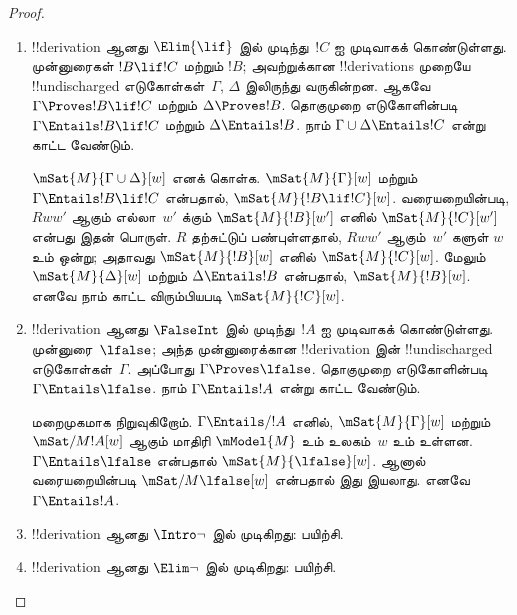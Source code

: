 \documentclass[../../../include/open-logic-section]{subfiles}
\begin{document}
\begin{proof}
\begin{enumerate}
    $\mSat{M}{\Gamma}[w]$ எனக் கொள்க. $Rww'$ ஆகும் எல்லா~$w'$ க்கும்,
    $\mSat{M}{!B}[w']$ எனில் $\mSat{M}{!C}[w']$ என்று காட்ட விரும்புகிறோம்.
    எனவே $Rww'$ மற்றும் $\mSat{M}{!B}[w']$ எனக் கொள்க.
     இன்படி,
    $\mSat{M}{\Gamma}[w']$. $\Gamma \cup \{!B\} \Entails !C$ என்பதால்,
    நாம் காட்ட விரும்பியபடி $\mSat{M}{!C}[w']$.

  \item !!{derivation} ஆனது $\Elim{\lif}$ இல் முடிந்து~$!C$ ஐ முடிவாகக்
    கொண்டுள்ளது. முன்னுரைகள் $!B \lif !C$ மற்றும் $!B$; அவற்றுக்கான
    !!{derivation}s முறையே !!{undischarged} எடுகோள்கள்~$\Gamma$,
    $\Delta$ இலிருந்து வருகின்றன. ஆகவே $\Gamma \Proves !B \lif !C$ மற்றும்
    $\Delta \Proves !B$. தொகுமுறை எடுகோளின்படி $\Gamma \Entails !B \lif !C$
    மற்றும் $\Delta \Entails !B$. நாம் $\Gamma \cup \Delta \Entails !C$
    என்று காட்ட வேண்டும்.

    $\mSat{M}{\Gamma \cup \Delta}[w]$ எனக் கொள்க.
    $\mSat{M}{\Gamma}[w]$ மற்றும் $\Gamma \Entails !B \lif !C$ என்பதால்,
    $\mSat{M}{!B \lif !C}[w]$. வரையறையின்படி, $Rww'$ ஆகும் எல்லா~$w'$
    க்கும் $\mSat{M}{!B}[w']$ எனில் $\mSat{M}{!C}[w']$ என்பது இதன் பொருள்.
    $R$ தற்சுட்டுப் பண்புள்ளதால், $Rww'$ ஆகும்~$w'$ களுள் $w$ உம் ஒன்று;
    அதாவது $\mSat{M}{!B}[w]$ எனில் $\mSat{M}{!C}[w]$. மேலும்
    $\mSat{M}{\Delta}[w]$ மற்றும் $\Delta \Entails !B$ என்பதால்,
    $\mSat{M}{!B}[w]$. எனவே நாம் காட்ட விரும்பியபடி
    $\mSat{M}{!C}[w]$.

  \item !!{derivation} ஆனது $\FalseInt$ இல் முடிந்து~$!A$ ஐ முடிவாகக்
    கொண்டுள்ளது. முன்னுரை~$\lfalse$; அந்த முன்னுரைக்கான !!{derivation} இன்
    !!{undischarged} எடுகோள்கள்~$\Gamma$. அப்போது
    $\Gamma \Proves \lfalse$. தொகுமுறை எடுகோளின்படி
    $\Gamma \Entails \lfalse$. நாம் $\Gamma \Entails !A$ என்று காட்ட
    வேண்டும்.

    மறைமுகமாக நிறுவுகிறோம். $\Gamma \Entails/ !A$ எனில்,
    $\mSat{M}{\Gamma}[w]$ மற்றும் $\mSat/{M}{!A}[w]$ ஆகும் மாதிரி
    $\mModel{M}$ உம் உலகம்~$w$ உம் உள்ளன. $\Gamma \Entails \lfalse$
    என்பதால் $\mSat{M}{\lfalse}[w]$. ஆனால் வரையறையின்படி
    $\mSat/{M}{\lfalse}[w]$ என்பதால் இது இயலாது. எனவே
    $\Gamma \Entails !A$.
  \item !!{derivation} ஆனது $\Intro\lnot$ இல் முடிகிறது: பயிற்சி.
  \item !!{derivation} ஆனது $\Elim\lnot$ இல் முடிகிறது: பயிற்சி.
  \end{enumerate}
\end{proof}
\end{document}
